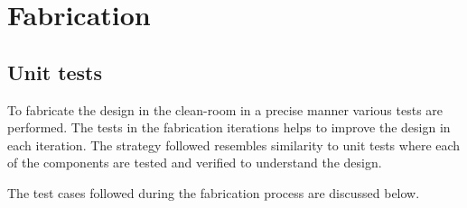 \documentclass[../report.tex]{subfiles}
\begin{document}
	
	
\chapter{Fabrication}

\section{Unit tests}
To fabricate the design in the clean-room in a precise manner various tests are performed. The tests in the fabrication iterations helps to improve the design in each iteration. The strategy followed resembles similarity to unit tests where each of the components are tested and verified to understand the design. 


\noindent The test cases followed during the fabrication process are discussed below. 
\end{document}
